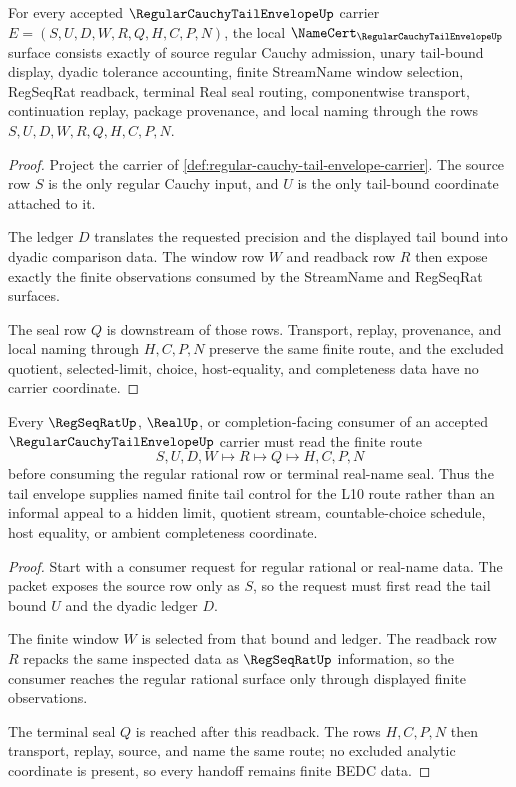 \begin{theorem}
\label{thm:regular-cauchy-tail-envelope-namecert-obligations}
For every accepted $\RegularCauchyTailEnvelopeUp$ carrier $E=(S,U,D,W,R,Q,H,C,P,N)$, the local $\NameCert_{\RegularCauchyTailEnvelopeUp}$ surface consists exactly of source regular Cauchy admission, unary tail-bound display, dyadic tolerance accounting, finite StreamName window selection, RegSeqRat readback, terminal Real seal routing, componentwise transport, continuation replay, package provenance, and local naming through the rows $S,U,D,W,R,Q,H,C,P,N$.
\end{theorem}
\begin{proof}
Project the carrier of \autoref{def:regular-cauchy-tail-envelope-carrier}. The source row $S$ is the only regular Cauchy input, and $U$ is the only tail-bound coordinate attached to it.

The ledger $D$ translates the requested precision and the displayed tail bound into dyadic comparison data. The window row $W$ and readback row $R$ then expose exactly the finite observations consumed by the StreamName and RegSeqRat surfaces.

The seal row $Q$ is downstream of those rows. Transport, replay, provenance, and local naming through $H,C,P,N$ preserve the same finite route, and the excluded quotient, selected-limit, choice, host-equality, and completeness data have no carrier coordinate.
\end{proof}

\begin{theorem}
\label{thm:regular-cauchy-tail-envelope-handoff}
Every $\RegSeqRatUp$, $\RealUp$, or completion-facing consumer of an accepted $\RegularCauchyTailEnvelopeUp$ carrier must read the finite route
$$
S,U,D,W \longmapsto R \longmapsto Q \longmapsto H,C,P,N
$$
before consuming the regular rational row or terminal real-name seal. Thus the tail envelope supplies named finite tail control for the L10 route rather than an informal appeal to a hidden limit, quotient stream, countable-choice schedule, host equality, or ambient completeness coordinate.
\end{theorem}
\begin{proof}
Start with a consumer request for regular rational or real-name data. The packet exposes the source row only as $S$, so the request must first read the tail bound $U$ and the dyadic ledger $D$.

The finite window $W$ is selected from that bound and ledger. The readback row $R$ repacks the same inspected data as $\RegSeqRatUp$ information, so the consumer reaches the regular rational surface only through displayed finite observations.

The terminal seal $Q$ is reached after this readback. The rows $H,C,P,N$ then transport, replay, source, and name the same route; no excluded analytic coordinate is present, so every handoff remains finite BEDC data.
\end{proof}

